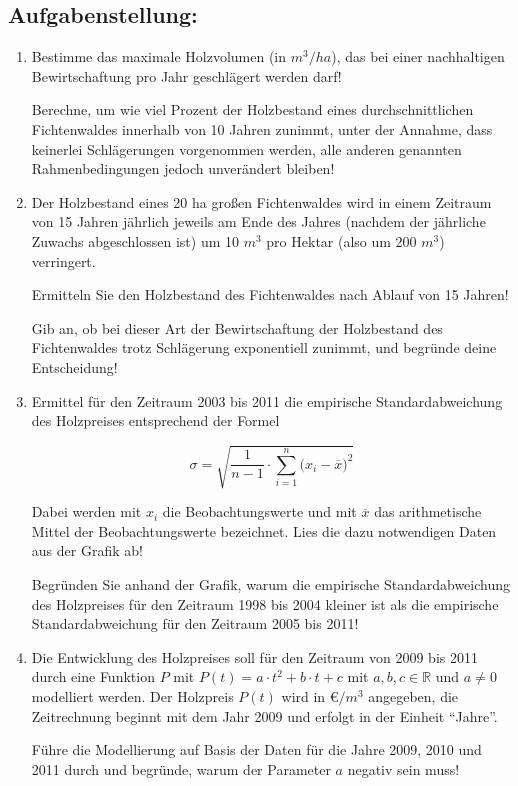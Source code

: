 \begin{langesbeispiel}
\subsection{Aufgabenstellung:}
\begin{enumerate}
	\item Bestimme das maximale Holzvolumen (in $m^3/ha$), das bei einer nachhaltigen Bewirtschaftung pro Jahr geschlägert werden darf!
	
Berechne, um wie viel Prozent der Holzbestand eines durchschnittlichen Fichtenwaldes innerhalb von 10 Jahren zunimmt, unter der Annahme, dass keinerlei Schlägerungen vorgenommen werden, alle anderen genannten Rahmenbedingungen jedoch unverändert bleiben!

\item Der Holzbestand eines 20 ha großen Fichtenwaldes wird in einem Zeitraum von 15 Jahren jährlich jeweils am Ende des Jahres (nachdem der jährliche Zuwachs abgeschlossen ist) um 10 $m^3$ pro Hektar (also um 200 $m^3$) verringert.

Ermitteln Sie den Holzbestand des Fichtenwaldes nach Ablauf von 15 Jahren!

Gib an, ob bei dieser Art der Bewirtschaftung der Holzbestand des Fichtenwaldes trotz Schlägerung exponentiell zunimmt, und begründe deine Entscheidung!
	
\item Ermittel für den Zeitraum 2003 bis 2011 die empirische Standardabweichung des Holzpreises entsprechend der Formel

$$\sigma=\sqrt{\frac{1}{n-1}\cdot\sum^n_{i=1}({x_i-\overline{x})^2}}$$

Dabei werden mit $x_i$ die Beobachtungswerte und mit $\overline{x}$ das arithmetische Mittel der Beobachtungswerte bezeichnet. Lies die dazu notwendigen Daten aus der Grafik ab!

Begründen Sie anhand der Grafik, warum die empirische Standardabweichung des
Holzpreises für den Zeitraum 1998 bis 2004 kleiner ist als die empirische Standardabweichung für den Zeitraum 2005 bis 2011!

\item Die Entwicklung des Holzpreises soll für den Zeitraum von 2009 bis 2011 durch eine Funktion $P$ mit $P(t)=a\cdot t^2+b\cdot t+c$ mit $a,b,c\in\mathbb{R}$ und $a\neq 0$ modelliert werden. Der Holzpreis $P(t)$ wird in \euro$/m^3$ angegeben, die Zeitrechnung beginnt mit dem Jahr 2009 und erfolgt in der Einheit "`Jahre"'.

Führe die Modellierung auf Basis der Daten für die Jahre 2009, 2010 und 2011 durch und begründe, warum der Parameter $a$ negativ sein muss!


\end{enumerate}
\end{langesbeispiel}
